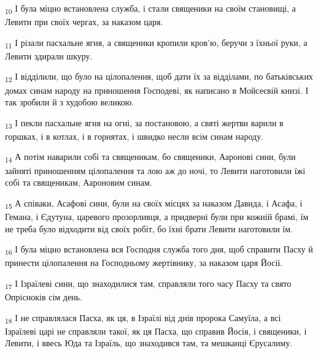 \begin{tcolorbox}
\textsubscript{10} І була міцно встановлена служба, і стали священики на своїм становищі, а Левити при своїх чергах, за наказом царя.
\end{tcolorbox}
\begin{tcolorbox}
\textsubscript{11} І різали пасхальне ягня, а священики кропили кров'ю, беручи з їхньої руки, а Левити здирали шкуру.
\end{tcolorbox}
\begin{tcolorbox}
\textsubscript{12} І відділили, що було на цілопалення, щоб дати їх за відділами, по батьківських домах синам народу на приношення Господеві, як написано в Мойсеєвій книзі. І так зробили й з худобою великою.
\end{tcolorbox}
\begin{tcolorbox}
\textsubscript{13} І пекли пасхальне ягня на огні, за постановою, а святі жертви варили в горшках, і в котлах, і в горнятах, і швидко несли всім синам народу.
\end{tcolorbox}
\begin{tcolorbox}
\textsubscript{14} А потім наварили собі та священикам, бо священики, Ааронові сини, були зайняті приношенням цілопалення та лою аж до ночі, то Левити наготовили їжі собі та священикам, Аароновим синам.
\end{tcolorbox}
\begin{tcolorbox}
\textsubscript{15} А співаки, Асафові сини, були на своїх місцях за наказом Давида, і Асафа, і Гемана, і Єдутуна, царевого прозорливця, а придверні були при кожній брамі, їм не треба було відходити від своїх робіт, бо їхні брати Левити наготовили їм.
\end{tcolorbox}
\begin{tcolorbox}
\textsubscript{16} І була міцно встановлена вся Господня служба того дня, щоб справити Пасху й принести цілопалення на Господньому жертівнику, за наказом царя Йосії.
\end{tcolorbox}
\begin{tcolorbox}
\textsubscript{17} І Ізраїлеві сини, що знаходилися там, справляли того часу Пасху та свято Опрісноків сім день.
\end{tcolorbox}
\begin{tcolorbox}
\textsubscript{18} І не справлялася Пасха, як ця, в Ізраїлі від днів пророка Самуїла, а всі Ізраїлеві царі не справляли такої, як ця Пасха, що справив Йосія, і священики, і Левити, і ввесь Юда та Ізраїль, що знаходився там, та мешканці Єрусалиму.
\end{tcolorbox}

